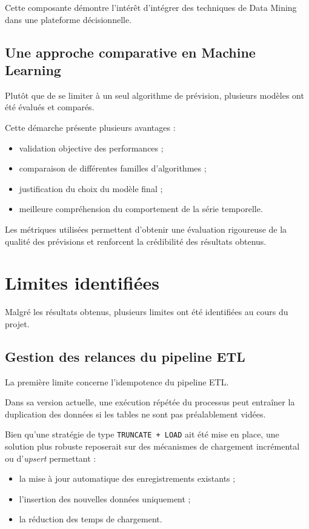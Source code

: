 \documentclass[12pt,a4paper,twoside]{report}
\begin{document}
Cette composante démontre l'intérêt d'intégrer des techniques de Data Mining dans une plateforme décisionnelle.

\subsection{Une approche comparative en Machine Learning}

Plutôt que de se limiter à un seul algorithme de prévision, plusieurs modèles ont été évalués et comparés.

Cette démarche présente plusieurs avantages :

\begin{itemize}
    \item validation objective des performances ;
    \item comparaison de différentes familles d'algorithmes ;
    \item justification du choix du modèle final ;
    \item meilleure compréhension du comportement de la série temporelle.
\end{itemize}

Les métriques utilisées permettent d'obtenir une évaluation rigoureuse de la qualité des prévisions et renforcent la crédibilité des résultats obtenus.

\section{Limites identifiées}

Malgré les résultats obtenus, plusieurs limites ont été identifiées au cours du projet.

\subsection{Gestion des relances du pipeline ETL}

La première limite concerne l'idempotence du pipeline ETL.

Dans sa version actuelle, une exécution répétée du processus peut entraîner la duplication des données si les tables ne sont pas préalablement vidées.

Bien qu'une stratégie de type \texttt{TRUNCATE + LOAD} ait été mise en place, une solution plus robuste reposerait sur des mécanismes de chargement incrémental ou d'\textit{upsert} permettant :

\begin{itemize}
    \item la mise à jour automatique des enregistrements existants ;
    \item l'insertion des nouvelles données uniquement ;
    \item la réduction des temps de chargement.
\end{itemize}
\end{document}
